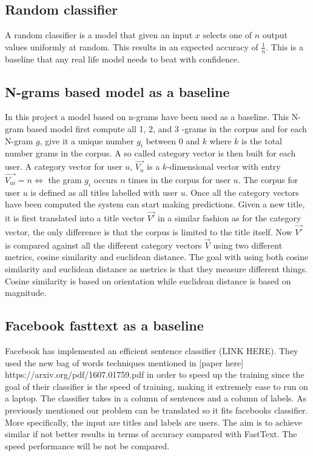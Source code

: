 \subsection{Random classifier}
A random classifier is a model that given an input $x$ selects one of $n$ output values uniformly at random. This results in an expected accuracy of $\frac{1}{n}$. This is a baseline that any real life model needs to beat with confidence.

\subsection{N-grams based model as a baseline}
In this project a model based on n-grams \parencite{cavnar1994n} have been used as a baseline. This N-gram based model first compute  all 1, 2, and 3 -grams in the corpus and for each N-gram $g$, give it a unique number $g_i$ between $0$ and $k$ where $k$ is the total number grams in the corpus. A so called category vector is then built for each user. A category vector for user $u$, $\vec{V_u}$ is a $k$-dimensional vector with entry $\vec{V_{ui}} = n \iff $ the gram $g_i$ occurs $n$ times in the corpus for user $u$. The corpus for user $u$ is defined as all titles labelled with user $u$. Once all the category vectors have been computed the system can start making predictions. Given a new title, it is first translated into a title vector $\vec{V'}$ in a similar fashion as for the category vector, the only difference is that the corpus is limited to the title itself. Now $\vec{V'}$ is compared against all the different category vectors $\vec{V}$ using two different metrics, cosine similarity \parencite{steinbach2000comparison} and euclidean distance. The goal with using both cosine similarity and euclidean distance as metrics is that they measure different things. Cosine similarity is based on orientation while euclidean distance is based on magnitude.

\subsection{Facebook fasttext as a baseline}
Facebook has implemented an efficient sentence classifier (LINK HERE). They used the new bag of words techniques mentioned in [paper here] https://arxiv.org/pdf/1607.01759.pdf in order to speed up the training since the goal of their classifier is the speed of training, making it extremely ease to run on a laptop. 
The classifier takes in a column of sentences and a column of labels. As previously mentioned our problem can be translated so it fits facebooks classifier. More specifically, the input are titles and labels are users. 
The aim is to achieve similar if not better results in terms of accuracy compared with FastText. The speed performance will be not be compared.
